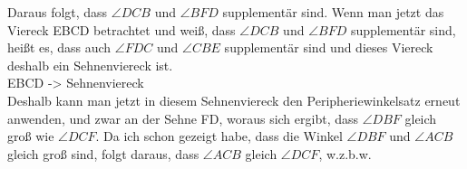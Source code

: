 \documentclass[12pt]{article}
\begin{document}
Daraus folgt, dass \(\angle DCB\) und \(\angle BFD\) supplementär sind. Wenn man jetzt das Viereck EBCD betrachtet und weiß, dass \(\angle DCB\) und \(\angle BFD\) supplementär sind, heißt es, dass auch \(\angle FDC\) und \(\angle CBE\) supplementär sind und dieses Viereck deshalb ein Sehnenviereck ist.
\\
EBCD -> Sehnenviereck\\

Deshalb kann man jetzt in diesem Sehnenviereck den Peripheriewinkelsatz erneut anwenden, und zwar an der Sehne FD, woraus sich ergibt, dass \(\angle DBF\) gleich groß wie \(\angle DCF\). Da ich schon gezeigt habe, dass die Winkel \(\angle DBF\) und \(\angle ACB\) gleich groß sind, folgt daraus, dass \(\angle ACB\) gleich \(\angle DCF\), w.z.b.w.
\end{document}

